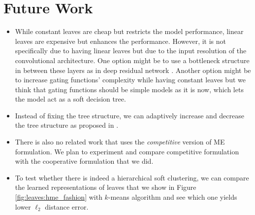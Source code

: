 \documentclass[a4paper,onesided,12pt]{report}
\begin{document}
\section{Future Work}
\label{sec:future}
\begin{itemize}
\item While constant leaves are cheap but restricts the model performance, linear leaves are expensive but enhances the performance. However, it is not specifically due to having linear leaves but due to the input resolution of the convolutional architecture. One option might be to use a bottleneck structure in between these layers as in deep residual network \cite{he2016identity}. Another option might be to increase gating functions' complexity while having constant leaves but we think that gating functions should be simple models as it is now, which lets the model act as a soft decision tree.

\item Instead of fixing the tree structure, we can adaptively increase and decrease the tree structure as proposed in \cite{irsoy2012soft,irsoy2014budding}.

\item There is also no related work that uses the \emph{competitive} version of ME formulation. We plan to experiment and compare competitive formulation with the cooperative formulation that we did.

\item To test whether there is indeed a hierarchical soft clustering, we can compare the learned representations of leaves that we show in Figure \ref{fig:leaves:hme_fashion} with $k$-means algorithm and see which one yields lower $\ell_2$ distance error.
\end{itemize}



\end{document}
